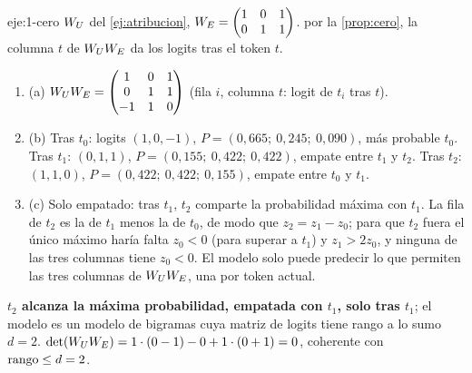\begin{solucion}{eje:1-cero}
\datos $W_{U}$ del \cref{ej:atribucion}, $W_{E}=\begin{pmatrix}1&0&1\\0&1&1\end{pmatrix}$.
\planteamiento por la \cref{prop:cero}, la columna $t$ de $W_{U}W_{E}$ da los logits tras el token $t$.
\pasos
\begin{enumerate}[label=\arabic*.]
  \item (a) $W_{U}W_{E}=\begin{pmatrix}1&0&1\\0&1&1\\-1&1&0\end{pmatrix}$ (fila $i$, columna $t$: logit de $t_i$ tras $t$).
  \item (b) Tras $t_0$: logits $(1,0,-1)$, $P=(0{,}665;\allowbreak\ 0{,}245;\allowbreak\ 0{,}090)$, más probable $t_0$. Tras $t_1$: $(0,1,1)$, $P=(0{,}155;\allowbreak\ 0{,}422;\allowbreak\ 0{,}422)$, empate entre $t_1$ y $t_2$. Tras $t_2$: $(1,1,0)$, $P=(0{,}422;\allowbreak\ 0{,}422;\allowbreak\ 0{,}155)$, empate entre $t_0$ y $t_1$.
  \item (c) Solo empatado: tras $t_1$, $t_2$ comparte la probabilidad máxima con $t_1$. La fila de $t_2$ es la de $t_1$ menos la de $t_0$, de modo que $z_2=z_1-z_0$; para que $t_2$ fuera el único máximo haría falta $z_0<0$ (para superar a $t_1$) y $z_1>2z_0$, y ninguna de las tres columnas tiene $z_0<0$. El modelo solo puede predecir lo que permiten las tres columnas de $W_{U}W_{E}$, una por token actual.
\end{enumerate}
\resultado \textbf{$t_2$ alcanza la máxima probabilidad, empatada con $t_1$, solo tras $t_1$}; el modelo es un modelo de bigramas cuya matriz de logits tiene rango a lo sumo $d=2$.
\comprobacion $\det(W_{U}W_{E})=1\cdot(0-1)-0+1\cdot(0+1)=0$, coherente con $\operatorname{rango}\le d=2$.
\end{solucion}


